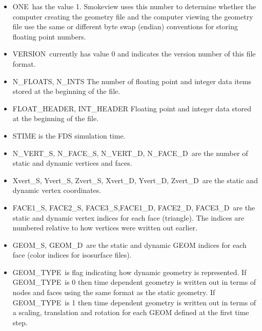 \documentclass[12pt]{article}
\begin{document}
\begin{itemize}
\item {\ct ONE}\ has the value 1. Smokeview uses this number to determine whether the computer creating the geometry file and the computer viewing the geometry file use the same or different byte swap (endian) conventions for storing floating point numbers.
\item {\ct VERSION}\ currently has value 0 and indicates the version number of this file format.
\item {\ct N\_FLOATS, N\_INTS} The number of floating point and integer data items stored at the beginning of the file.
\item {\ct FLOAT\_HEADER, INT\_HEADER} Floating point and integer data stored at the beginning of the file.
\item {\ct STIME} is the FDS simulation time.
\item {\ct N\_VERT\_S, N\_FACE\_S, N\_VERT\_D, N\_FACE\_D}\ are the number of static and dynamic vertices and faces.
\item {\ct Xvert\_S, Yvert\_S, Zvert\_S, Xvert\_D, Yvert\_D, Zvert\_D}\ are the static and dynamic vertex coordinates.
\item {\ct FACE1\_S, FACE2\_S, FACE3\_S,FACE1\_D, FACE2\_D, FACE3\_D}\ are the static and dynamic vertex indices for each face (triangle).  The indices are numbered relative to how vertices were written out earlier.
\item {\ct GEOM\_S, GEOM\_D}\ are the static and dynamic GEOM indices for each face (color indices for isosurface files).
\item {\ct GEOM\_TYPE}\ is flag indicating how dynamic geometry is represented. If {\ct GEOM\_TYPE}\ is 0 then time dependent geometry is written out in terms of nodes and faces using the same format as the static geometry. If {\ct GEOM\_TYPE}\ is 1 then time dependent geometry is written out in terms of a scaling, translation and rotation for each GEOM defined at the first time step.
\end{itemize}
\end{document}
